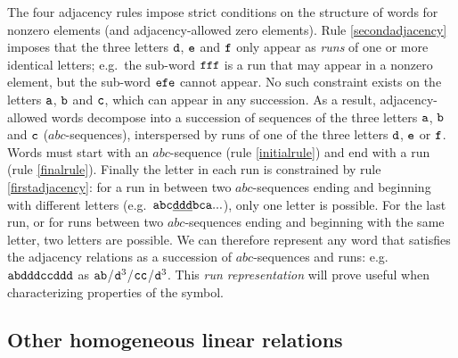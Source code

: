 \documentclass[12pt]{article}
\begin{document}
The four adjacency rules impose strict conditions on the structure of words for nonzero elements (and adjacency-allowed zero elements). Rule \ref{secondadjacency} imposes that the three letters ${\tt d}$, ${\tt e}$ and ${\tt f}$ only appear as \emph{runs} of one or more identical letters; e.g.\ the sub-word ${\tt fff}$ is a run that may appear in a nonzero element, but the sub-word ${\tt efe}$ cannot appear. No such constraint exists on the letters ${\tt a}$, ${\tt b}$ and ${\tt c}$, which can appear in any succession. As a result, adjacency-allowed words decompose into a succession of sequences of the three letters ${\tt a}$, ${\tt b}$ and ${\tt c}$ ($abc$-sequences), interspersed by runs of one of the three letters ${\tt d}$, ${\tt e}$ or ${\tt f}$. Words must start with an $abc$-sequence (rule \ref{initialrule}) and end with a run (rule \ref{finalrule}). Finally the letter in each run is constrained by rule \ref{firstadjacency}: for a run in between two $abc$-sequences ending and beginning with different letters (e.g.\ ${\tt abc\underline{ddd}bca...}$), only one letter is possible. For the last run, or for runs between two $abc$-sequences ending and beginning with the same letter, two letters are possible. 
%
We can therefore represent any word that satisfies the adjacency relations as a succession of $abc$-sequences and runs: e.g.\ ${\tt abdddccddd}$ as ${\tt ab}$/${\tt d}^3$/${\tt cc}$/${\tt d}^3$. This \emph{run representation} will prove useful when characterizing properties of the symbol.

\subsection{Other homogeneous linear relations}
\end{document}
